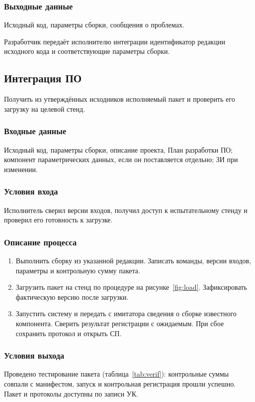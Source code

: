 \documentclass{tpks}
\begin{document}
\subsubsection{Выходные данные}
Исходный код, параметры сборки, сообщения о проблемах.

Разработчик передаёт исполнителю интеграции идентификатор редакции исходного кода и соответствующие параметры сборки.

\subsection{Интеграция ПО}
Получить из утверждённых исходников исполняемый пакет и проверить его загрузку на целевой стенд.

\subsubsection{Входные данные}
Исходный код, параметры сборки, описание проекта, План разработки ПО; компонент параметрических данных, если он поставляется отдельно; ЗИ при изменении.

\subsubsection{Условия входа}
Исполнитель сверил версии входов, получил доступ к испытательному стенду и проверил его готовность к загрузке.

\subsubsection{Описание процесса}
\begin{enumerate}
\item Выполнить сборку из указанной редакции. Записать команды, версии входов, параметры и контрольную сумму пакета.
\item Загрузить пакет на стенд по процедуре на рисунке~\ref{fig:load}. Зафиксировать фактическую версию после загрузки.
\item Запустить систему и передать с имитатора сведения о сборке известного компонента. Сверить результат регистрации с ожидаемым. При сбое сохранить протокол и открыть СП.
\end{enumerate}

\subsubsection{Условия выхода}
Проведено тестирование пакета (таблица~\ref{tab:verif}): контрольные суммы совпали с манифестом, запуск и контрольная регистрация прошли успешно. Пакет и протоколы доступны по записи УК.
\end{document}
